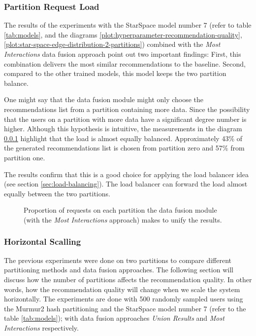 \subsubsection{Partition Request Load}
\label{subsubsec:partition-request-load}
The results of the experiments with the StarSpace model number 7 (refer to table \ref{tab:models}, and the diagrams \ref{plot:hyperparameter-recommendation-quality}, \ref{plot:star-space-edge-distribution-2-partitions}) combined with the \emph{Most Interactions} data fusion approach point out two important findings: First, this combination delivers the most similar recommendations to the baseline. Second, compared to the other trained models, this model keeps the two partition balance.


One might say that the data fusion module might only choose the recommendations list from a partition containing more data. Since the possibility that the users on a partition with more data have a significant degree number is higher. Although this hypothesis is intuitive, the measurements in the diagram \ref{subsubsec:partition-request-load} highlight that the load is almost equally balanced. Approximately 43\% of the generated recommendations list is chosen from partition zero and 57\% from partition one.

The results confirm that this is a good choice for applying the load balancer idea (see section \ref{sec:load-balancing}). The load balancer can forward the load almost equally between the two partitions.

\begin{figure}[!htb]
    \centering
    
    \caption{Proportion of requests on each partition the data fusion module (with the \emph{Most Interactions} approach) makes to unify the results.}
    \label{plot:request-distribution}
\end{figure}


\subsubsection{Horizontal Scalling}
\label{subsubsec:eval-horizontal-scalling}
The previous experiments were done on two partitions to compare different partitioning methods and data fusion approaches. The following section will discuss how the number of partitions affects the recommendation quality. In other words, how the recommendation quality will change when we scale the system horizontally. The experiments are done with 500 randomly sampled users using the Murmur2 hash partitioning and the StarSpace model number 7 (refer to the table \ref{tab:models}); with data fusion approaches \emph{Union Results} and \emph{Most Interactions} respectively.


